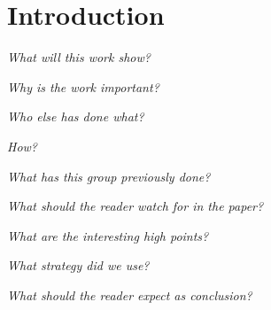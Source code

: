
\section{Introduction}

\emph{What will this work show?}


\emph{Why is the work important?}


\emph{Who else has done what?}

\emph{How?}

\emph{What has this group previously done?}


\emph{What should the reader watch for in the paper?}

\emph{What are the interesting high points?}

\emph{What strategy did we use?}


\emph{What should the reader expect as conclusion?}

